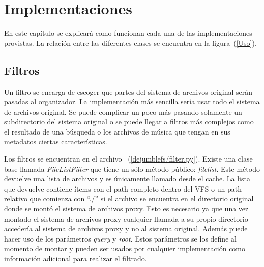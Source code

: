 \chapter{Implementaciones}
\ifpdf
    \graphicspath{{Chapter3/Chapter3Figs/PNG/}{Chapter3/Chapter3Figs/PDF/}{Chapter3/Chapter3Figs/}}
\else
    \graphicspath{{Chapter3/Chapter3Figs/EPS/}{Chapter3/Chapter3Figs/}}
\fi

En este capítulo se explicará como funcionan cada una de las implementaciones provistas. La relación entre las diferentes clases se encuentra en la figura~(\ref{Uso}).




\section{Filtros}

Un filtro se encarga de escoger que partes del sistema de archivos original serán pasadas al organizador. La implementación más sencilla sería usar todo el sistema de archivos original. Se puede complicar un poco más pasando solamente un subdirectorio del sistema original o se puede llegar a filtros más complejos como el resultado de una búsqueda o los archivos de música que tengan en sus metadatos ciertas características.


Los filtros se encuentran en el archivo ~(\ref{dejumblefs/filter.py}). Existe una clase base llamada \textit{FileListFilter} que tiene un sólo método público: \textit{filelist}. Este método devuelve una lista de archivos y es únicamente llamado desde el cache. La lista que devuelve contiene ítems con el path completo dentro del VFS o un path relativo que comienza con ``./'' si el archivo se encuentra en el directorio original donde se montó el sistema de archivos proxy. Esto es necesario ya que una vez montado el sistema de archivos proxy cualquier llamada a su propio directorio accedería al sistema de archivos proxy y no al sistema original. Además puede hacer uso de los parámetros \textit{query} y \textit{root}. Estos parámetros se los define al momento de montar y pueden ser usados por cualquier implementación como información adicional para realizar el filtrado.

